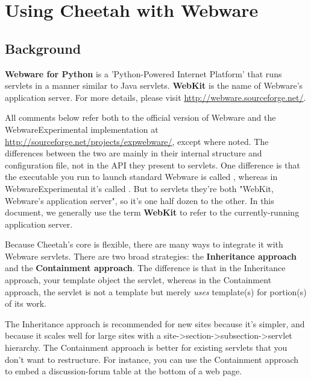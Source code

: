 \section{Using Cheetah with Webware}
\label{webware}

\subsection{Background}
\label{webware.background}

{\bf Webware for Python} is a 'Python-Powered Internet Platform' that runs
servlets in a manner similar to Java servlets.  {\bf WebKit} is the name of
Webware's application server.  For more details, please visit
\url{http://webware.sourceforge.net/}.

All comments below refer both to the official version of Webware and the
WebwareExperimental implementation at 
\url{http://sourceforge.net/projects/expwebware/}, except where noted.  The
differences between the two are mainly in their internal structure and
configuration file, not in the API they present to servlets.  One difference
is that the executable you run to launch standard Webware is called
, whereas in WebwareExperimental it's
called . But to servlets they're both "WebKit, Webware's
application server", so it's one half dozen to the other.  In this document,
we generally use the term {\bf WebKit} to refer to the currently-running
application server.

Because Cheetah's core is flexible, there are many ways to integrate it with
Webware servlets.  There are two broad strategies: the {\bf Inheritance
approach} and the {\bf Containment approach}.  The difference is
that in the Inheritance approach, your template object  the
servlet, whereas in the Containment approach, the servlet is not a template but
merely {\em uses} template(s) for portion(s) of its work.

The Inheritance approach is recommended for new sites because it's simpler, and
because it scales well for large sites with a
site->section->subsection->servlet hierarchy.  The Containment approach is
better for existing servlets that you don't want to restructure.  For instance,
you can use the Containment approach to embed a discussion-forum table at the
bottom of a web page.  

